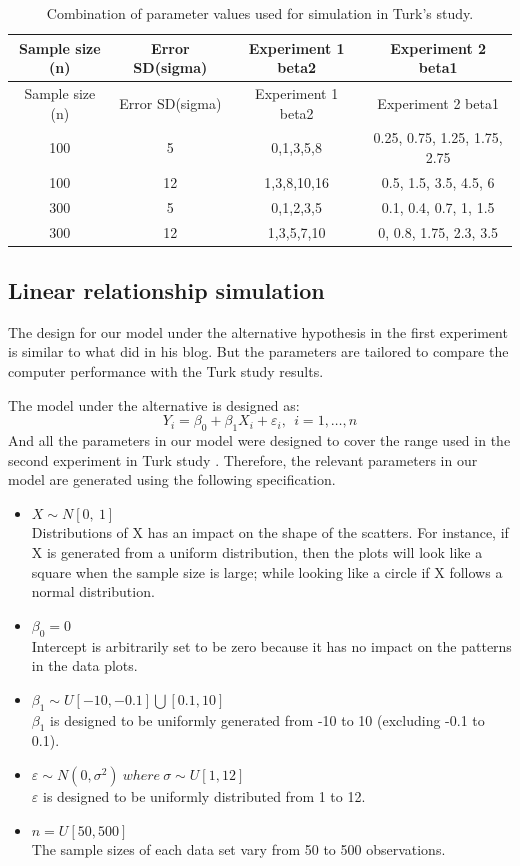 \documentclass[12pt]{article}
\begin{document}
\begin{longtable}[]{@{}cccc@{}}
\caption{Combination of parameter values used for simulation in Turk's
study.}\tabularnewline
\toprule
Sample size (n) & Error SD(sigma) & Experiment 1 beta2 & Experiment 2
beta1\tabularnewline
\midrule
\endfirsthead
\toprule
Sample size (n) & Error SD(sigma) & Experiment 1 beta2 & Experiment 2
beta1\tabularnewline
\midrule
\endhead
100 & 5 & 0,1,3,5,8 & 0.25, 0.75, 1.25, 1.75, 2.75\tabularnewline
100 & 12 & 1,3,8,10,16 & 0.5, 1.5, 3.5, 4.5, 6\tabularnewline
300 & 5 & 0,1,2,3,5 & 0.1, 0.4, 0.7, 1, 1.5\tabularnewline
300 & 12 & 1,3,5,7,10 & 0, 0.8, 1.75, 2.3, 3.5\tabularnewline
\bottomrule
\end{longtable}

\subsection{Linear relationship
simulation}\label{linear-relationship-simulation}

The design for our model under the alternative hypothesis in the first
experiment is similar to what \citet{SIM18} did in his blog. But the
parameters are tailored to compare the computer performance with the
Turk study results.

The model under the alternative is designed as:
\[Y_i = \beta_0 + \beta_1 X_{i}  + \varepsilon_i, ~~i=1, \dots , n\] And
all the parameters in our model were designed to cover the range used in
the second experiment in Turk study \citep{MM13}. Therefore, the
relevant parameters in our model are generated using the following
specification.

\begin{itemize}
\item
  \(X \sim N[0,\ 1]\)\\
  Distributions of X has an impact on the shape of the scatters. For
  instance, if X is generated from a uniform distribution, then the
  plots will look like a square when the sample size is large; while
  looking like a circle if X follows a normal distribution.
\item
  \(\beta_0 = 0\)\\
  Intercept is arbitrarily set to be zero because it has no impact on
  the patterns in the data plots.
\item
  \(\beta_1\sim U[-10, -0.1] \bigcup [0.1, 10]\)\\
  \(\beta_1\) is designed to be uniformly generated from -10 to 10
  (excluding -0.1 to 0.1).
\item
  \(\varepsilon\sim N(0, \sigma^2) \ where\ \sigma \sim U[1,12]\)\\
  \(\varepsilon\) is designed to be uniformly distributed from 1 to 12.
\item
  \(n=U[50,500]\)\\
  The sample sizes of each data set vary from 50 to 500 observations.
\end{itemize}
\end{document}
